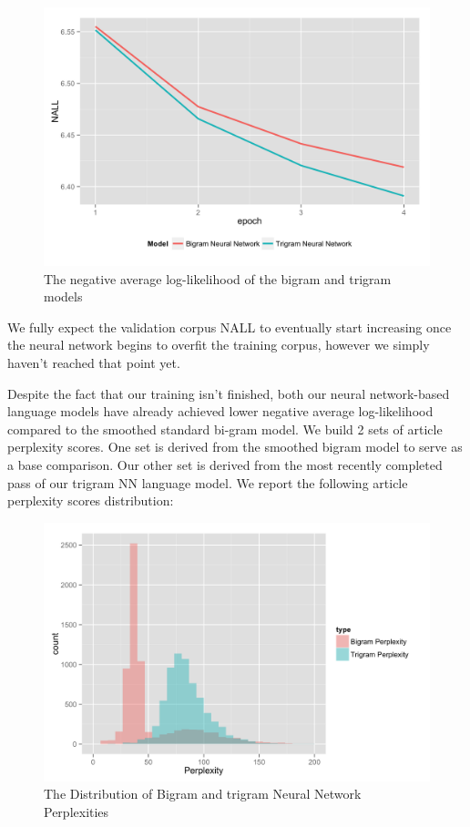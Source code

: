 \documentclass[fleqn,12pt]{SelfArx} %
\begin{document}
\begin{figure}[ht]
\includegraphics[width=\linewidth]{nall.png}
\caption{The negative average log-likelihood of the bigram and trigram models}
\label{fig:perp_hist}
\end{figure}
 
We fully expect the validation corpus NALL to eventually start increasing once the neural network begins to overfit the training corpus, however we simply haven't reached that point yet. 
 
Despite the fact that our training isn't finished, both our neural network-based language models have already achieved lower negative average log-likelihood compared to the smoothed standard bi-gram model. We build 2 sets of article perplexity scores. One set is derived from the smoothed bigram model to serve as a base comparison. Our other set is derived from the most recently completed pass of our trigram NN language model. We report the following article perplexity scores distribution:


\begin{figure}[ht]
\includegraphics[width=\linewidth]{perplexity.png}
\caption{The Distribution of Bigram and trigram Neural Network Perplexities}
\label{fig:perp_hist}
\end{figure}
\end{document}
